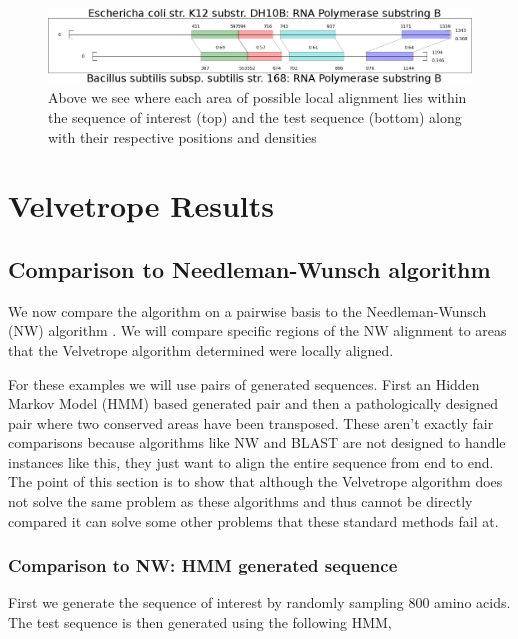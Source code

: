 \documentclass[phd,tocprelim]{cornell}
\begin{document}
 \begin{figure}[htp]%
 \centerline{\includegraphics[width=\textwidth]{figures/velvetrope/localAlignmentsBreakout.png}}
 \caption[Local alignments]{Above we see where each area of possible local alignment lies within the sequence of interest (top) and the test sequence (bottom) along with their respective positions and densities}
 	\label{fig:vr03}
 \end{figure}


\chapter{Velvetrope Results} %
\label{cha:Velvetrope Results}

\section{Comparison to Needleman-Wunsch algorithm}

We now compare the algorithm on a pairwise basis to the Needleman-Wunsch (NW) algorithm \cite{Durbin06} \cite{Needleman70}. We will compare specific regions of the NW alignment to areas that the Velvetrope algorithm determined were locally aligned.

For these examples we will use pairs of generated sequences. First an Hidden Markov Model (HMM) based generated pair and then a pathologically designed pair where two conserved areas have been transposed. These aren't exactly fair comparisons because algorithms like NW and BLAST are not designed to handle instances like this, they just want to align the entire sequence from end to end. The point of this section is to show that although the Velvetrope algorithm does not solve the same problem as these algorithms and thus cannot be directly compared it can solve some other problems that these standard methods fail at.

\subsection{Comparison to NW: HMM generated sequence}

First we generate the sequence of interest by randomly sampling 800 amino acids. The test sequence is then generated using the following HMM,
\end{document}
